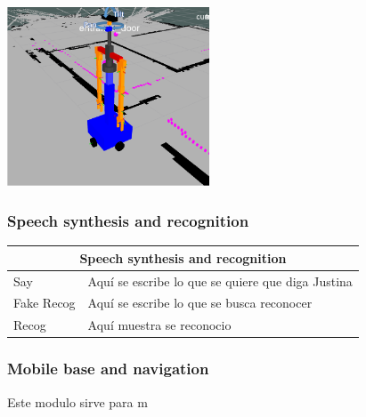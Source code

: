 \documentclass[user_manual.tex]{subfiles}
\begin{document}
\begin{center}
\includegraphics[width=0.45\textwidth]{Figures/Puesta_marcha/Tilt_pan.png}
\end{center}

\subsubsection{Speech synthesis and recognition}

\begin{table}[H]
\begin{center}
\begin{tabular}{|l|l|}%

\hline
\multicolumn{2}{|c|}{Speech synthesis and recognition} \\ \hline
Say        & Aquí se escribe lo que se quiere que diga Justina\\ \hline
Fake Recog & Aquí se escribe lo que se busca reconocer \\ \hline
Recog      & Aquí muestra se reconocio     \\ \hline


\end{tabular}
\end{center}
\end{table}

\subsubsection{Mobile base and navigation}

Este modulo sirve para m
\end{document}
